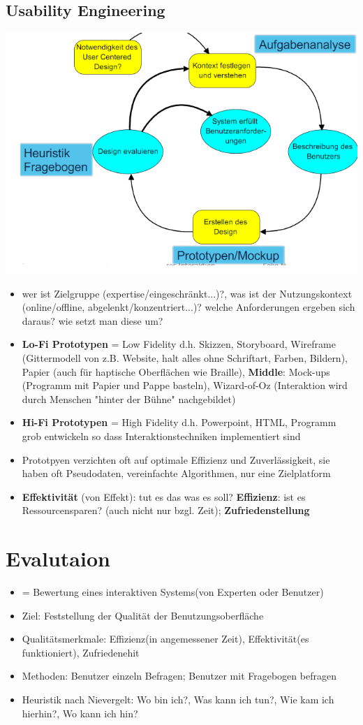 \documentclass[12pt,landscape]{article}
\begin{document}
\begin{multicols}{3}
\subsection{Usability Engineering}
\includegraphics[scale=0.53]{UCD.PNG}
\begin{itemize}
\item wer ist Zielgruppe (expertise/eingeschränkt...)?, was ist der Nutzungskontext (online/offline, abgelenkt/konzentriert...)? welche Anforderungen ergeben sich daraus? wie setzt man diese um?
\item \textbf{Lo-Fi Prototypen} = Low Fidelity d.h. Skizzen, Storyboard, Wireframe (Gittermodell von z.B. Website, halt alles ohne Schriftart, Farben, Bildern), Papier (auch für haptische Oberflächen wie Braille), \textbf{Middle}: Mock-ups (Programm mit Papier und Pappe basteln), Wizard-of-Oz (Interaktion wird durch Menschen "hinter der Bühne" nachgebildet)
\item \textbf{Hi-Fi Prototypen} = High Fidelity d.h. Powerpoint, HTML, Programm grob entwickeln so dass Interaktionstechniken implementiert sind
\item Prototpyen verzichten oft auf optimale Effizienz und Zuverlässigkeit, sie haben oft Pseudodaten, vereinfachte Algorithmen, nur eine Zielplatform
\item \textbf{Effektivität} (von Effekt): tut es das was es soll? \textbf{Effizienz}: ist es Ressourcensparen? (auch nicht nur bzgl. Zeit); \textbf{Zufriedenstellung}
\end{itemize}


\section{Evalutaion}
\begin{itemize}
\item = Bewertung eines interaktiven Systems(von Experten oder Benutzer)
\item Ziel: Feststellung der Qualität der Benutzungsoberfläche
\item Qualitätsmerkmale: Effizienz(in angemessener Zeit), Effektivität(es funktioniert), Zufriedenehit
\item Methoden: Benutzer einzeln Befragen; Benutzer mit Fragebogen befragen
\item Heuristik nach Nievergelt: Wo bin ich?, Was kann ich tun?, Wie kam ich hierhin?, Wo kann ich hin?

\end{itemize}
\end{multicols}
\end{document}
